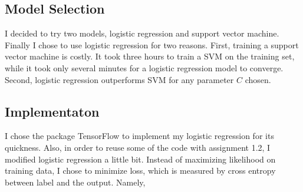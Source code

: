 \documentclass{article}
\begin{document}
\subsection{Model Selection}
I decided to try two models, logistic regression and support vector machine. Finally I chose to use logistic regression for two reasons. First, training a support vector machine is costly. It took three hours to train a SVM on the training set, while it took only several minutes for a logistic regression model to converge. Second, logistic regression outperforms SVM for any parameter $C$ chosen. 
\subsection{Implementaton}
I chose the package TensorFlow to implement my logistic regression for its quickness. Also, in order to reuse some of the code with assignment 1.2, I modified logistic regression a little bit. Instead of maximizing likelihood on training data, I chose to minimize loss, which is measured by cross entropy between label and the output. Namely, 
\end{document}
